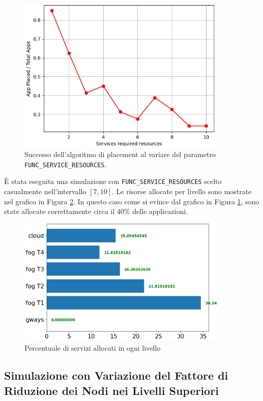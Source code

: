 \begin{figure}[!ht]
  \includegraphics[width=10cm]{images/resources_placement_success}
  \centering
  \caption{Successo dell'algoritmo di placement al variare del parametro \texttt{FUNC\_SERVICE\_RESOURCES}.}
  \label{fig:resources_placement_success}
\end{figure}

È stata eseguita una simulazione con \texttt{FUNC\_SERVICE\_RESOURCES} scelto casualmente nell'intervallo $[7, 10]$. Le risorse allocate per livello sono mostrate nel grafico in Figura \ref{fig:resources_placement_per_level}. In questo caso come si evince dal grafico in Figura \ref{fig:resources_placement_success}, sono state allocate correttamente circa il 40\% delle applicazioni.

\begin{figure}[!ht]
  \includegraphics[width=10cm]{images/resources_placement_per_level}
  \centering
  \caption{Percentuale di servizi allocati in ogni livello}
  \label{fig:resources_placement_per_level}
\end{figure}

\subsection{Simulazione con Variazione del Fattore di Riduzione dei Nodi nei Livelli Superiori}

